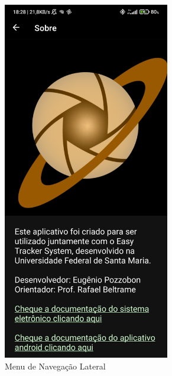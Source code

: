 \begin{figure}[!htb]
	\centering
	\caption{Telas Informativas}
	\begin{subfigure}[b]{0.4\textwidth}
		\centering
		\includegraphics[width=0.8\textwidth]{figuras/desAplicativo/about}
		\caption{Menu de Navegação Lateral}
		\label{about}
	\end{subfigure}
	\hfill
	\begin{subfigure}[b]{0.4\textwidth}
		\centering

\end{subfigure}
\end{figure}

